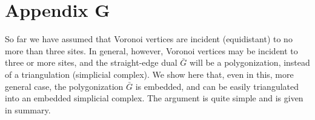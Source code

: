 \documentclass[11pt]{article}
\begin{document}
\section*{Appendix G}\label{app:generic}



	So far we have assumed that Voronoi vertices are incident (equidistant) to no more than three sites. 
	In general, however, Voronoi vertices may be incident to three or more sites, and the straight-edge dual 
	$\bar{G}$ will be a polygonization, instead of a triangulation (simplicial complex). 
	We show here that, even in this, more general case, the polygonization $\bar{G}$ is embedded, and can 
	be easily triangulated into  an embedded simplicial complex. 
	The argument is quite simple and is given in summary. \\
\end{document}
